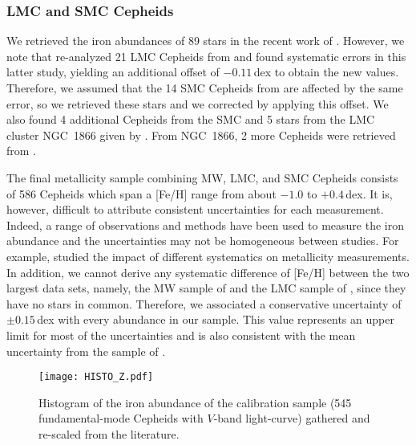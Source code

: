 \documentclass[article]{aa} %
\begin{document}
\subsubsection{LMC and SMC Cepheids}
We retrieved the iron abundances of 89 stars in the recent work of \cite{Romaniello2022}. However, we note that \cite{Romaniello2022} re-analyzed 21 LMC Cepheids from \cite{Romaniello2008} and found systematic errors in this latter study, yielding an additional offset of $-0.11\,$dex to obtain the new values. Therefore, we assumed that the 14 SMC Cepheids from \cite{Romaniello2008} are affected by the same error, so we retrieved these stars and we corrected by applying this offset.
We also found 4 additional Cepheids from the SMC and 5 stars from the LMC cluster NGC~1866 given by \cite{Lemasle2017}. From NGC~1866, 2 more Cepheids were retrieved from \cite{Molinaro2012}.

The final metallicity sample combining MW, LMC, and SMC Cepheids consists of 586 Cepheids which span a [Fe/H] range from about $-1.0$ to $+0.4\,$dex. It is, however, difficult to attribute consistent uncertainties for each measurement. Indeed, a range of observations and methods have been used to measure the iron abundance and the uncertainties may not be homogeneous between studies. For example, \cite{daSilva2022} studied the impact of different systematics on metallicity measurements. In addition, we cannot derive any systematic difference of [Fe/H] between the two largest data sets, namely, the MW sample of \cite{Luck2018} and the LMC sample of \cite{Romaniello2022}, since they have no stars in common. Therefore, we associated a conservative uncertainty of $\pm0.15\,$dex with every abundance in our sample. This value represents an upper limit for most of the uncertainties and is also consistent with the mean uncertainty from the sample of \cite{Luck2018}.
\begin{figure}
\begin{center}
\texttt{[image: HISTO\_Z.pdf]}
\caption{\small Histogram of the iron abundance of the calibration sample (545 fundamental-mode Cepheids with $V$-band light-curve) gathered and re-scaled from the literature. \label{fig:histo_Z}} 
\end{center}
\end{figure}
\end{document}
